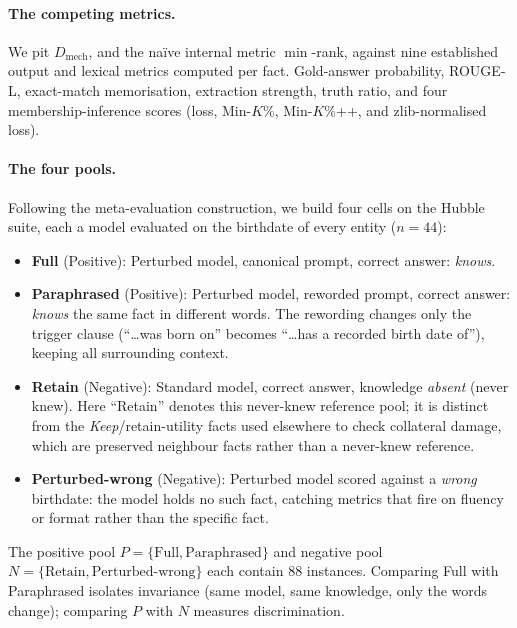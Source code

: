 \paragraph{The competing metrics.}
We pit $D_\text{mech}$, and the na\"ive internal metric $\min$-rank, against nine established output and
lexical metrics computed per fact. Gold-answer probability, ROUGE-L, exact-match memorisation,
extraction strength, truth ratio, and four membership-inference scores (loss, Min-$K$\%, Min-$K$\%++, and
zlib-normalised loss).

\paragraph{The four pools.}
Following the meta-evaluation construction, we build four cells on the Hubble suite, each a model evaluated
on the birthdate of every entity ($n=44$):
\begin{itemize}
  \item \textbf{Full} (Positive): Perturbed model, canonical prompt, correct answer: \emph{knows}.
  \item \textbf{Paraphrased} (Positive): Perturbed model, reworded prompt, correct answer: \emph{knows}
  the same fact in different words. The rewording changes only the trigger clause (``\ldots{}was born on''
  becomes ``\ldots{}has a recorded birth date of''), keeping all surrounding context.
  \item \textbf{Retain} (Negative): Standard model, correct answer, knowledge \emph{absent} (never knew).
  Here ``Retain'' denotes this never-knew reference pool; it is distinct from the \emph{Keep}/retain-utility
  facts used elsewhere to check collateral damage, which are preserved neighbour facts rather than a
  never-knew reference.
  \item \textbf{Perturbed-wrong} (Negative): Perturbed model scored against a \emph{wrong} birthdate:
  the model holds no such fact, catching metrics that fire on fluency or format rather than the specific
  fact.
\end{itemize}
The positive pool $P = \{\text{Full}, \text{Paraphrased}\}$ and negative pool $N = \{\text{Retain},
\text{Perturbed-wrong}\}$ each contain $88$ instances. Comparing Full with Paraphrased isolates invariance
(same model, same knowledge, only the words change); comparing $P$ with $N$ measures discrimination.

